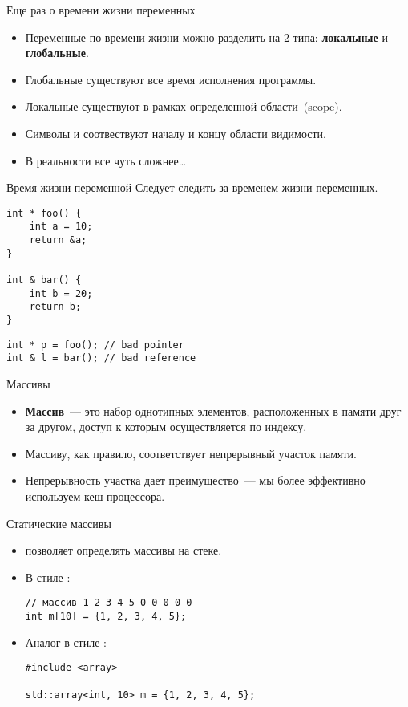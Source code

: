 \documentclass{beamer}
\begin{document}
\begin{frame}[fragile]{Еще раз о времени жизни переменных}
    \begin{itemize}
        \item Переменные по времени жизни можно разделить на 2 типа: {\bf локальные} и {\bf глобальные}.
        \item Глобальные существуют все время исполнения программы.
        \item Локальные существуют в рамках определенной области~(scope).
        \item Символы \code{\{} и \code{\}} соотвествуют началу и концу области видимости.
        \item В реальности все чуть сложнее\dots
    \end{itemize}
\end{frame}

\begin{frame}[fragile]{Время жизни переменной}
    Следует следить за временем жизни переменных.
    \begin{lstlisting}
int * foo() {
    int a = 10;
    return &a;
}

int & bar() {
    int b = 20;
    return b;
}
    \end{lstlisting}
    \begin{lstlisting}
int * p = foo(); // bad pointer
int & l = bar(); // bad reference
    \end{lstlisting}
\end{frame}

\begin{frame}[fragile]{Массивы}
    \begin{itemize}
        \item {\bf Массив}~--- это набор однотипных элементов, расположенных в памяти
            друг за другом, доступ к которым осуществляется по индексу.
        \item Массиву, как правило, соответствует непрерывный участок памяти.
        \item Непрерывность участка дает преимущество~--- мы более эффективно используем кеш процессора.
    \end{itemize}
\end{frame}

\begin{frame}[fragile]{Статические массивы}
    \begin{itemize}
        \item \langcpp позволяет определять массивы на стеке.
        \item В стиле \langc:
            \begin{lstlisting}
// массив 1 2 3 4 5 0 0 0 0 0
int m[10] = {1, 2, 3, 4, 5}; 
            \end{lstlisting}
        \item Аналог в стиле \langcpp:
            \begin{lstlisting}
#include <array>

std::array<int, 10> m = {1, 2, 3, 4, 5}; 
            \end{lstlisting}
    \end{itemize}
\end{frame}
\end{document}

